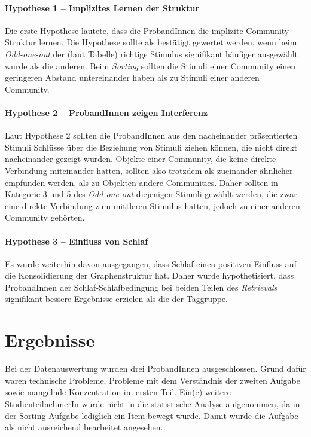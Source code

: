 \paragraph{Hypothese 1 – Implizites Lernen der Struktur}
Die erste Hypothese lautete, dass die ProbandInnen die implizite Community-Struktur lernen.
Die Hypothese sollte als bestätigt gewertet werden, wenn beim \textit{Odd-one-out} der (laut Tabelle) richtige Stimulus signifikant häufiger ausgewählt wurde als die anderen. Beim \textit{Sorting} sollten die Stimuli einer Community einen geringeren Abstand untereinander haben als zu Stimuli einer anderen Community.

\paragraph{Hypothese 2 – ProbandInnen zeigen Interferenz}
Laut Hypothese 2 sollten die ProbandInnen aus den nacheinander präsentierten Stimuli Schlüsse über die Beziehung von Stimuli ziehen können, die nicht direkt nacheinander gezeigt wurden. Objekte einer Community, die keine direkte Verbindung miteinander hatten, sollten also trotzdem als zueinander ähnlicher empfunden werden, als zu Objekten andere Communities.
Daher sollten in Kategorie 3 und 5 des \textit{Odd-one-out} diejenigen Stimuli gewählt werden, die zwar eine direkte Verbindung zum mittleren Stimulus hatten, jedoch zu einer anderen Community gehörten.

\paragraph{Hypothese 3 – Einfluss von Schlaf}
Es wurde weiterhin davon ausgegangen, dass Schlaf einen positiven Einfluss auf die Konsolidierung der Graphenstruktur hat. Daher wurde hypothetisiert, dass ProbandInnen der Schlaf-Schlafbedingung bei beiden Teilen des \textit{Retrievals} signifikant bessere Ergebnisse erzielen als die der Taggruppe.

\section{Ergebnisse}
\label{S:3}
Bei der Datenauswertung wurden drei ProbandInnen ausgeschlossen. Grund dafür waren technische Probleme, Probleme mit dem Verständnis der zweiten Aufgabe sowie mangelnde Konzentration im ersten Teil.
Ein(e) weitere StudienteilnehmerIn wurde nicht in die statistische Analyse aufgenommen, da in der Sorting-Aufgabe lediglich ein Item bewegt wurde. Damit wurde die Aufgabe als nicht ausreichend bearbeitet angesehen.

